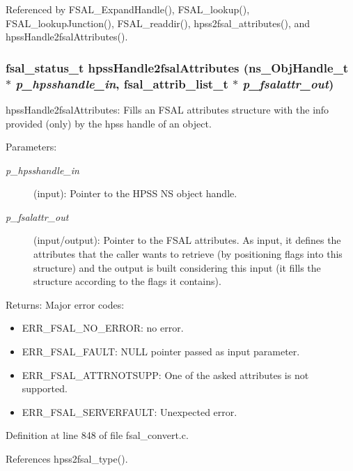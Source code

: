 Referenced by FSAL\_\-ExpandHandle(), FSAL\_\-lookup(), FSAL\_\-lookupJunction(), FSAL\_\-readdir(), hpss2fsal\_\-attributes(), and hpssHandle2fsalAttributes().
\subsubsection[{hpssHandle2fsalAttributes}]{\setlength{\rightskip}{0pt plus 5cm}fsal\_\-status\_\-t hpssHandle2fsalAttributes (ns\_\-ObjHandle\_\-t $\ast$ {\em p\_\-hpsshandle\_\-in}, \/  fsal\_\-attrib\_\-list\_\-t $\ast$ {\em p\_\-fsalattr\_\-out})}\label{fsal__convert_8c_f1b20dd7b00c695d3da12699a8ab4a93}


hpssHandle2fsalAttributes: Fills an FSAL attributes structure with the info provided (only) by the hpss handle of an object.

\begin{Desc}
\item[Parameters:]
\begin{description}
\item[{\em p\_\-hpsshandle\_\-in}](input): Pointer to the HPSS NS object handle. \item[{\em p\_\-fsalattr\_\-out}](input/output): Pointer to the FSAL attributes. As input, it defines the attributes that the caller wants to retrieve (by positioning flags into this structure) and the output is built considering this input (it fills the structure according to the flags it contains).\end{description}
\end{Desc}
\begin{Desc}
\item[Returns:]Major error codes:\begin{itemize}
\item ERR\_\-FSAL\_\-NO\_\-ERROR: no error.\item ERR\_\-FSAL\_\-FAULT: NULL pointer passed as input parameter.\item ERR\_\-FSAL\_\-ATTRNOTSUPP: One of the asked attributes is not supported.\item ERR\_\-FSAL\_\-SERVERFAULT: Unexpected error. \end{itemize}
\end{Desc}


Definition at line 848 of file fsal\_\-convert.c.

References hpss2fsal\_\-type().


